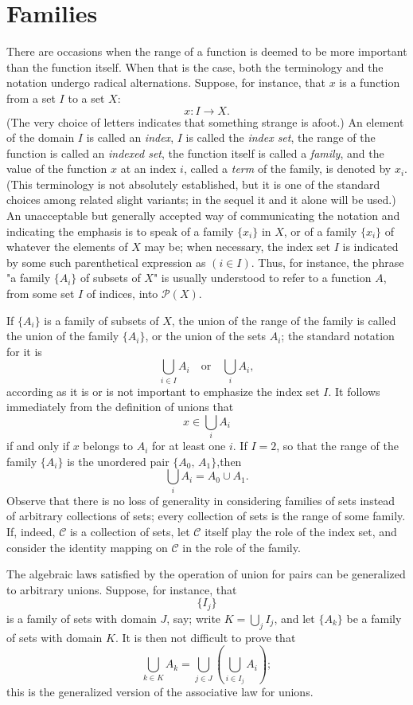 \section{Families}

There are occasions when the range of a function is deemed to be more important than the function itself. When that is the case, both the terminology and the notation undergo radical alternations. Suppose, for instance, that $x$ is a function from a set $I$ to a set $X$:
\[
	x : I \to X.
\]
(The very choice of letters indicates that something strange is afoot.) An element of the domain $I$ is called an \textit{index}, $I$ is called the \textit{index set}, the range of the function is called an \textit{indexed set}, the function itself is called a \textit{family}, and the value of the function $x$ at an index $i$, called a \textit{term} of the family, is denoted by $x_i$. (This terminology is not absolutely established, but it is one of the standard choices among related slight variants; in the sequel it and it alone will be used.) An unacceptable but generally accepted way of communicating the notation and indicating the emphasis is to speak of a family $\{x_i\}$ in $X$, or of a family $\{x_i\}$ of whatever the elements of $X$ may be; when necessary, the index set $I$ is indicated by some such parenthetical expression as $(i \in I)$. Thus, for instance, the phrase "a family $\{A_i\}$ of subsets of $X$" is usually understood to refer to a function $A$, from some set $I$ of indices, into $\mathcal{P}(X)$.

If $\{A_i\}$ is a family of subsets of $X$, the union of the range of the family is called the union of the family $\{A_i\}$, or the union of the sets $A_i$; the standard notation for it is
\[
	\bigcup_{i \in I} A_i \quad \text{or} \quad \bigcup_i A_i,
\]
according as it is or is not important to emphasize the index set $I$. It follows immediately from the definition of unions that
\[
	x \in \bigcup_i A_i
\]
if and only if $x$ belongs to $A_i$ for at least one $i$. If $I = 2$, so that the range of the family $\{A_i\}$ is the unordered pair $\{A_0, \, A_1\}$,then
\[
	\bigcup_i A_i = A_0 \cup A_1.
\]
Observe that there is no loss of generality in considering families of sets instead of arbitrary collections of sets; every collection of sets is the range of some family. If, indeed, $\mathcal{C}$ is a collection of sets, let $\mathcal{C}$ itself play the role of the index set, and consider the identity mapping on $\mathcal{C}$ in the role of the family.

The algebraic laws satisfied by the operation of union for pairs can be generalized to arbitrary unions. Suppose, for instance, that \[\{I_j\}\] is a family of sets with domain $J$, say; write $K = \bigcup_j I_j$, and let $\{A_k\}$ be a family of sets with domain $K$. It is then not difficult to prove that
\[
	\bigcup_{k \in K} A_k = \bigcup_{j \in J} \left( \bigcup_{i \in I_j} A_i\right);
\]
this is the generalized version of the associative law for unions.

